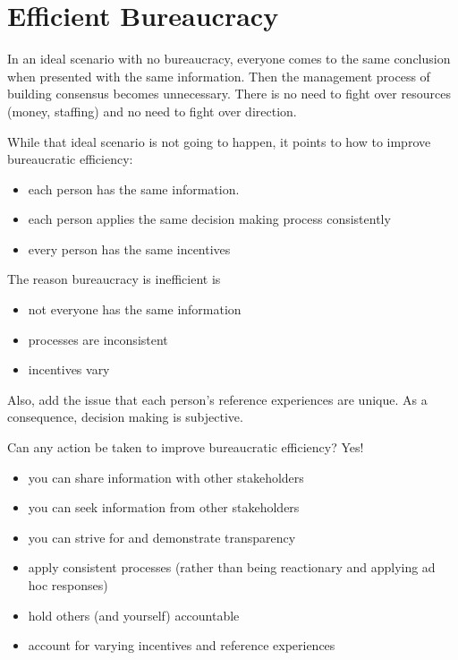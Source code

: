 
\section{Efficient Bureaucracy}

In an ideal scenario with no bureaucracy, everyone comes to the same conclusion when presented with the same information. Then the management process of building consensus becomes unnecessary. There is no need to fight over resources (money, staffing) and no need to fight over direction.

While that ideal scenario is not going to happen, it points to how to improve bureaucratic efficiency:
\begin{itemize}
\item each person has the same information. 
\item each person applies the same decision making process consistently
\item every person has the same incentives
\end{itemize}
The reason bureaucracy is inefficient is
\begin{itemize}
\item not everyone has the same information
\item processes are inconsistent
\item incentives vary
\end{itemize}
Also, add the issue that each person's reference experiences are unique. As a consequence, decision making is subjective. 

Can any action be taken to improve bureaucratic efficiency? Yes!
\begin{itemize}
\item you can share information with other stakeholders
\item you can seek information from other stakeholders
\item you can strive for and demonstrate transparency
\item apply consistent processes (rather than being reactionary and applying ad hoc responses)
\item hold others (and yourself) accountable 
\item account for varying incentives and reference experiences
\end{itemize}
